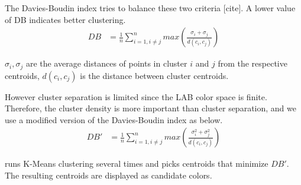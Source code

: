 The Davies-Boudin index tries to balance these two criteria [cite].  A lower value of DB indicates better clustering.
\begin{align}
DB &= \frac{1}{n} \sum_{i=1, i \neq j}^{n}max\left(\frac{\sigma_{i} + \sigma_{j}}{d(c_{i}, c_{j})}\right)
\end{align}

$\sigma_{i}, \sigma_{j}$ are the average distances of points in cluster $i$ and $j$ from the respective centroids, $d(c_{i}, c_{j})$ is the distance between cluster centroids.

However  cluster separation is limited since the LAB color space is finite. Therefore, the cluster density is more important than cluster separation, and we use a modified version of the Davies-Boudin index as below.
\begin{align}
DB' &= \frac{1}{n} \sum_{i=1, i \neq j}^{n}max\left(\frac{\sigma_{i}^{2} + \sigma_{j}^{2}}{d(c_{i}, c_{j})}\right)
\end{align}

\system runs K-Means clustering several times and picks centroids that minimize $DB'$. The resulting centroids are displayed as candidate colors.